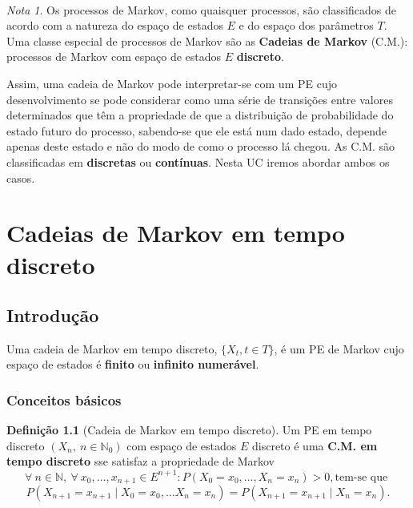 \documentclass[
  11pt,
  a4paper,
]{book}
\theoremstyle{definition}
\newtheorem{definition}{Definição}[chapter]
\theoremstyle{definition}
\theoremstyle{definition}
\theoremstyle{definition}
\theoremstyle{remark}
\newtheorem*{remark}{Nota }
\begin{document}
\(\,\)

\begin{remark}
Os processos de Markov, como quaisquer processos, são classificados de acordo com a natureza do espaço de estados \(E\) e do espaço dos parâmetros \(T\). Uma classe especial de processos de Markov são as \textbf{Cadeias de Markov} (C.M.): processos de Markov com espaço de estados \(E\) \textbf{discreto}.

Assim, uma cadeia de Markov pode interpretar-se com um PE cujo desenvolvimento se pode considerar como uma série de transições entre valores determinados que têm a propriedade de que a distribuição de probabilidade do estado futuro do processo, sabendo-se que ele está num dado estado, depende apenas deste estado e não do modo de como o processo lá chegou. As C.M. são classificadas em \textbf{discretas} ou \textbf{contínuas}. Nesta UC iremos abordar ambos os casos.
\end{remark}

\chapter{Cadeias de Markov em tempo discreto}\label{cadeias-de-markov-em-tempo-discreto}

\section{Introdução}\label{introducao}

Uma cadeia de Markov em tempo discreto, \(\{X_t, t \in T\}\), é um PE de Markov cujo espaço de estados é \textbf{finito} ou \textbf{infinito numerável}.

\subsection{Conceitos básicos}\label{conceitos-basicos}

\begin{definition}[Cadeia de Markov em tempo discreto]
Um PE em tempo discreto \((X_n, ~n \in \mathbb{N}_0)\) com espaço de estados \(E\) discreto é uma \textbf{C.M. em tempo discreto} sse satisfaz a propriedade de Markov
\[\forall ~n \in \mathbb{N}, ~\forall ~x_0, \ldots, x_{n+1} \in E^{n+1}: P(X_0=x_0, \ldots, X_n=x_n)>0, \text{tem-se que }\] \[P(X_{n+1}=x_{n+1} \mid X_{0}=x_0, \ldots X_{n}=x_n)=P(X_{n+1}=x_{n+1} \mid X_{n}=x_n).\]
\end{definition}

\(\,\)
\end{document}
